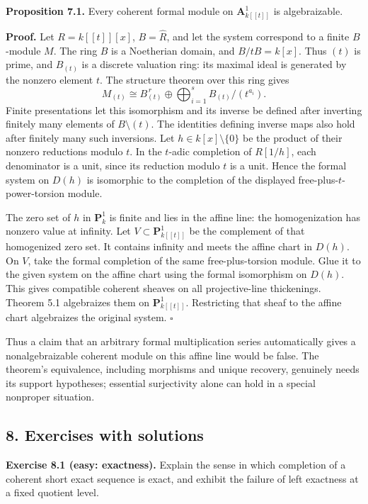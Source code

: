 \documentclass[11pt]{article}
\begin{document}
\textbf{Proposition 7.1.} Every coherent formal module on
\(\mathbf A^1_{k[[t]]}\) is algebraizable.

\textbf{Proof.} Let \(R=k[[t]][x]\), \(B=\widehat R\), and let the
system correspond to a finite \(B\)-module \(M\). The ring \(B\) is a
Noetherian domain, and \(B/tB=k[x]\). Thus \((t)\) is prime, and
\(B_{(t)}\) is a discrete valuation ring: its maximal ideal is generated
by the nonzero element \(t\). The structure theorem over this ring gives
\[
M_{(t)}\cong B_{(t)}^{\,r}\oplus\bigoplus_{i=1}^s B_{(t)}/(t^{a_i}).
\] Finite presentations let this isomorphism and its inverse be defined
after inverting finitely many elements of \(B\setminus(t)\). The
identities defining inverse maps also hold after finitely many such
inversions. Let \(h\in k[x]\setminus\{0\}\) be the product of their
nonzero reductions modulo \(t\). In the \(t\)-adic completion of
\(R[1/h]\), each denominator is a unit, since its reduction modulo \(t\)
is a unit. Hence the formal system on \(D(h)\) is isomorphic to the
completion of the displayed free-plus-\(t\)-power-torsion module.

The zero set of \(h\) in \(\mathbf P^1_k\) is finite and lies in the
affine line: the homogenization has nonzero value at infinity. Let
\(V\subset\mathbf P^1_{k[[t]]}\) be the complement of that homogenized
zero set. It contains infinity and meets the affine chart in \(D(h)\).
On \(V\), take the formal completion of the same free-plus-torsion
module. Glue it to the given system on the affine chart using the formal
isomorphism on \(D(h)\). This gives compatible coherent sheaves on all
projective-line thickenings. Theorem 5.1 algebraizes them on
\(\mathbf P^1_{k[[t]]}\). Restricting that sheaf to the affine chart
algebraizes the original system. \(\square\)

Thus a claim that an arbitrary formal multiplication series
automatically gives a nonalgebraizable coherent module on this affine
line would be false. The theorem's equivalence, including morphisms and
unique recovery, genuinely needs its support hypotheses; essential
surjectivity alone can hold in a special nonproper situation.

\subsection{8. Exercises with solutions}\label{exercises-with-solutions}

\textbf{Exercise 8.1 (easy: exactness).} Explain the sense in which
completion of a coherent short exact sequence is exact, and exhibit the
failure of left exactness at a fixed quotient level.
\end{document}
